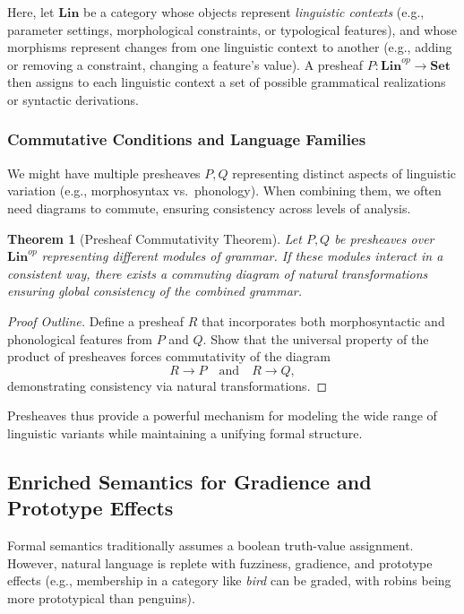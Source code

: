 \documentclass[12pt]{article}
\theoremstyle{plain}
\newtheorem{theorem}{Theorem}
\theoremstyle{definition}
\begin{document}
Here, let \(\mathbf{Lin}\) be a category whose objects represent \emph{linguistic contexts} (e.g., parameter settings, morphological constraints, or typological features), and whose morphisms represent changes from one linguistic context to another (e.g., adding or removing a constraint, changing a feature's value). A presheaf \(P: \mathbf{Lin}^{op} \to \mathbf{Set}\) then assigns to each linguistic context a set of possible grammatical realizations or syntactic derivations.

\subsubsection{Commutative Conditions and Language Families}
We might have multiple presheaves \(P, Q\) representing distinct aspects of linguistic variation (e.g., morphosyntax vs.\ phonology). When combining them, we often need diagrams to commute, ensuring consistency across levels of analysis.

\begin{theorem}[Presheaf Commutativity Theorem]
Let \(P, Q\) be presheaves over \(\mathbf{Lin}^{op}\) representing different modules of grammar. If these modules interact in a consistent way, there exists a commuting diagram of natural transformations ensuring global consistency of the combined grammar.
\end{theorem}

\begin{proof}[Proof Outline]
Define a presheaf \(R\) that incorporates both morphosyntactic and phonological features from \(P\) and \(Q\). Show that the universal property of the product of presheaves forces commutativity of the diagram 
\[
  R \longrightarrow P
  \quad\text{and}\quad
  R \longrightarrow Q,
\]
demonstrating consistency via natural transformations.
\end{proof}

Presheaves thus provide a powerful mechanism for modeling the wide range of linguistic variants while maintaining a unifying formal structure.

\subsection{Enriched Semantics for Gradience and Prototype Effects}
Formal semantics traditionally assumes a boolean truth-value assignment. However, natural language is replete with fuzziness, gradience, and prototype effects (e.g., membership in a category like \emph{bird} can be graded, with robins being more prototypical than penguins). 
\end{document}
